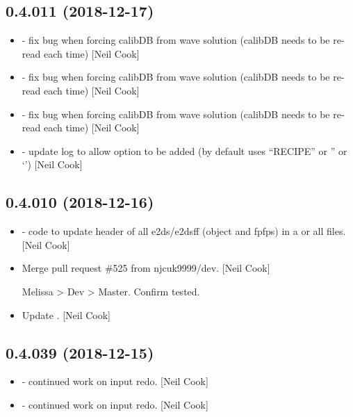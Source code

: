 \documentclass[a4paper,10pt,english]{report}
\begin{document}
\subsection{0.4.011 (2018-12-17)}
\label{\detokenize{misc/changelog:id230}}\begin{itemize}
\item {} 
 - fix bug when forcing calibDB from wave
solution (calibDB needs to be re-read each time) {[}Neil Cook{]}

\item {} 
 - fix bug when forcing calibDB from wave
solution (calibDB needs to be re-read each time) {[}Neil Cook{]}

\item {} 
 - fix bug when forcing calibDB from wave
solution (calibDB needs to be re-read each time) {[}Neil Cook{]}

\item {} 
 - update log to allow option to be added (by default uses
“RECIPE” or ” or ‘’) {[}Neil Cook{]}

\end{itemize}


\subsection{0.4.010 (2018-12-16)}
\label{\detokenize{misc/changelog:id231}}\begin{itemize}
\item {} 
 - code to update header of all e2ds/e2dsff
(object and fpfps) in a  or all files. {[}Neil Cook{]}

\item {} 
Merge pull request \#525 from njcuk9999/dev. {[}Neil Cook{]}

Melissa \textendash{}\textgreater{} Dev \textendash{}\textgreater{} Master. Confirm tested.

\item {} 
Update . {[}Neil Cook{]}

\end{itemize}


\subsection{0.4.039 (2018-12-15)}
\label{\detokenize{misc/changelog:id232}}\begin{itemize}
\item {} 
 - continued work on input redo. {[}Neil Cook{]}

\item {} 
 - continued work on input redo. {[}Neil Cook{]}

\end{itemize}
\end{document}
